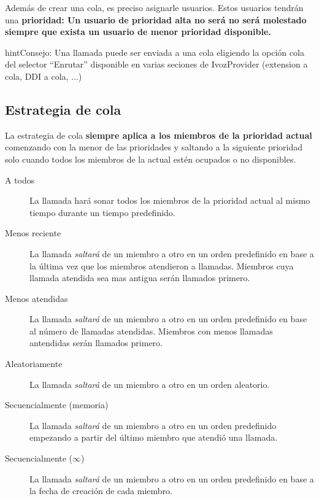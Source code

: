 \documentclass[letterpaper,10pt,spanish]{sphinxmanual}
\begin{document}
Además de crear una cola, es preciso asignarle usuarios. Estos usuarios tendrán una \textbf{prioridad: Un usuario de prioridad alta no será no será molestado siempre que exista un usuario de menor prioridad disponible.}

\begin{notice}{hint}{Consejo:}
Una llamada puede ser enviada a una cola eligiendo la opción cola del selector ``Enrutar'' disponible en varias seciones de IvozProvider (extension a cola, DDI a cola, ...)
\end{notice}


\subsection{Estrategia de cola}
\label{pbx_features/queues:queue-strategy}
La estrategia de cola \textbf{siempre aplica a los miembros de la prioridad actual} comenzando con la menor de las prioridades y saltando a la siguiente prioridad solo cuando todos los miembros de la actual estén ocupados o no disponibles.
\begin{description}
\item[{A todos}] \leavevmode{}\label{pbx_features/queues:term-ring-all}
La llamada hará sonar todos los miembros de la prioridad actual al mismo tiempo durante un tiempo predefinido.

\item[{Menos reciente}] \leavevmode{}\label{pbx_features/queues:term-least-recent}
La llamada \emph{saltará} de un miembro a otro en un orden predefinido en base a la última vez que los miembros atendieron a llamadas. Miembros cuya llamada atendida sea mas antigua serán llamados primero.

\item[{Menos atendidas}] \leavevmode{}\label{pbx_features/queues:term-fewer-calls}
La llamada \emph{saltará} de un miembro a otro en un orden predefinido en base al número de llamadas atendidas. Miembros con menos llamadas antendidas serán llamados primero.

\item[{Aleatoriamente}] \leavevmode{}\label{pbx_features/queues:term-random}
La llamada \emph{saltará} de un miembro a otro en un orden aleatorio.

\item[{Secuencialmente (memoria)}] \leavevmode{}\label{pbx_features/queues:term-round-robin-memory}
La llamada \emph{saltará} de un miembro a otro en un orden predefinido empezando a partir del último miembro que atendió una llamada.

\item[{Secuencialmente (\(\infty\))}] \leavevmode{}\label{pbx_features/queues:term-linear}
La llamada \emph{saltará} de un miembro a otro en un orden predefinido en base a la fecha de creación de cada miembro.

\end{description}
\end{document}
